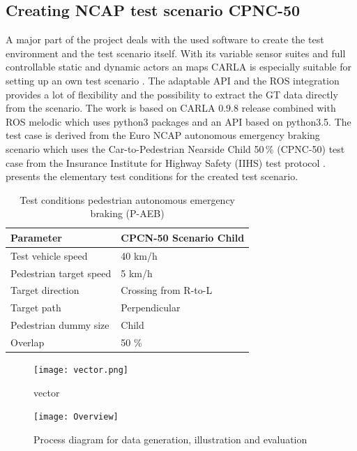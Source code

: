 
\subsection{Creating NCAP test scenario CPNC-50}
A major part of the project deals with the used software to create the test environment and the test scenario itself. With its variable sensor suites and full controllable static and dynamic actors an maps CARLA is especially suitable for setting up an own test scenario \cite{Dosovitskiy17}. The adaptable \ac{API} and the \ac{ROS} integration provides a lot of flexibility and the possibility to extract the \ac{GT} data directly from the scenario. The work is based on CARLA 0.9.8 release combined with \ac{ROS} melodic which uses python3 packages and an \ac{API} based on python3.5. The test case is derived from the Euro NCAP autonomous emergency braking scenario which uses the Car-to-Pedestrian Nearside Child 50\,\% (CPNC-50) test case from the Insurance Institute for Highway Safety (IIHS) test protocol \cite{NCAP, Protocoll}.  presents the elementary test conditions for the created test scenario. 

\begin{table}[h]
	\caption{Test conditions pedestrian autonomous emergency braking (P-AEB) \cite{Protocoll}}
	\label{Test conditions}
	\begin{center}
		\begin{tabular}{l l}
			\hline
			Parameter & CPCN-50 Scenario Child\\
			\hline
			Test vehicle speed & 40 km/h\\
			Pedestrian target speed & 5 km/h\\
			Target direction        & Crossing from R-to-L\\
			Target path             & Perpendicular\\
			Pedestrian dummy size   & Child\\
			Overlap                 & 50 \%\\
			\hline
			
			
		\end{tabular}
	\end{center}
\end{table}

\begin{figure}[H]
	\centering
	\texttt{[image: vector.png]}
	\caption{vector \cite{Aeberhard}}
	\label{fig:vectors}
\end{figure}

\begin{figure}[]
	\centering
	\texttt{[image: Overview]}
	\caption{Process diagram for data generation, illustration and evaluation}
	\label{fig:Overview}
\end{figure}

